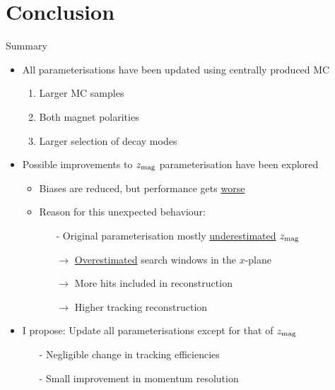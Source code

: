 \documentclass[xcolor={dvipsnames}]{beamer}
\begin{document}
\section{Conclusion}

\begin{frame}{Summary}
  \vspace{0.0cm}
  \begin{itemize}
    \setlength\itemsep{1.0em}
    \item{All parameterisations have been updated using centrally produced MC}
    \begin{enumerate}
      \item{Larger MC samples}
      \item{Both magnet polarities}
      \item{Larger selection of decay modes}
    \end{enumerate}
    \item{Possible improvements to $z_{\rm mag}$ parameterisation have been explored}
    \begin{itemize}
      \setlength\itemsep{0.3em}
      \item{Biases are reduced, but performance gets \underline{worse}}
      \item{Reason for this unexpected behaviour:}
      \begin{itemize}
        \item[-]{Original parameterisation mostly \underline{underestimated} $z_{\rm mag}$}
        \item[$\to$]{\underline{Overestimated} search windows in the $x$-plane}
        \item[$\to$]{More hits included in reconstruction}
        \item[$\to$]{Higher tracking reconstruction}
      \end{itemize}
    \end{itemize}
    \item{I propose: Update all parameterisations except for that of $z_{\rm mag}$}
    \begin{itemize}
      \item[-]{Negligible change in tracking efficiencies}
      \item[-]{Small improvement in momentum resolution}
    \end{itemize}
  \end{itemize}
\end{frame}
\end{document}
